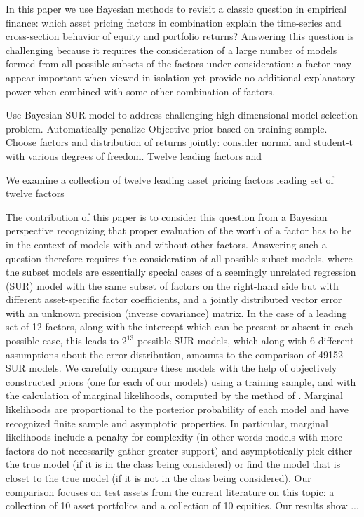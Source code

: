 In this paper we use Bayesian methods to revisit a classic question in empirical finance: which asset pricing factors in combination explain the time-series and cross-section behavior of equity and portfolio returns? 
Answering this question is challenging because it requires the consideration of a large number of models formed from all possible subsets of the factors under consideration: a factor may appear important when viewed in isolation yet provide no additional explanatory power when combined with some other combination of factors. 


Use Bayesian SUR model to address challenging high-dimensional model selection problem.
Automatically penalize 
Objective prior based on training sample.
Choose factors and distribution of returns jointly: consider normal and student-t with various degrees of freedom.
Twelve leading factors and 

We examine a collection of twelve leading asset pricing factors leading set of twelve factors

The contribution of this paper is to consider this question from a Bayesian perspective recognizing that proper evaluation of the worth of a factor has to be in the context of models with and without other factors. 
Answering such a question therefore requires the consideration of all possible subset models, where the subset models are essentially special cases of a seemingly unrelated regression (SUR) model with the same subset of factors on the right-hand side but with different asset-specific factor coefficients, and a jointly distributed vector error with an unknown precision (inverse covariance) matrix. 
In the case of a leading set of 12 factors, along with the intercept which can be present or absent in each possible case, this leads to $2^{13}$ possible SUR models, which along with 6 different assumptions about the error distribution, amounts to the comparison of 49152 SUR models. 
We carefully compare these models with the help of objectively constructed priors (one for each of our models) using a training sample, and with the calculation of marginal likelihoods, computed by the method of \cite{chib1995marginal}. 
Marginal likelihoods are proportional to the posterior probability of each model and have recognized finite sample and asymptotic properties. 
In particular, marginal likelihoods include a penalty for complexity (in other words models with more factors do not necessarily gather greater support) and asymptotically pick either the true model (if it is in the class being considered) or find the model that is closet to the true model (if it is not in the class being considered). 
Our comparison focuses on test assets from the current literature on this topic: a collection of 10 asset portfolios and a collection of 10 equities. Our results show ...

